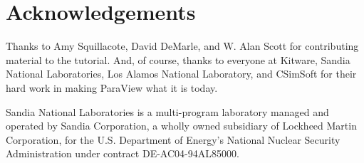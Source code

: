 \documentclass[@GLOBAL_OPTIONS@]{book}
\begin{document}
\tableofcontents

\listofexercise

\mainmatter











\backmatter

\chapter{Acknowledgements}

Thanks to Amy Squillacote, David DeMarle, and W. Alan Scott for
contributing material to the tutorial.  And, of course, thanks to everyone
at Kitware, Sandia National Laboratories, Los Alamos National Laboratory,
and CSimSoft for their hard work in making ParaView what it is today.

Sandia National Laboratories is a multi-program laboratory managed and
operated by Sandia Corporation, a wholly owned subsidiary of Lockheed
Martin Corporation, for the U.S. Department of Energy's National Nuclear
Security Administration under contract DE-AC04-94AL85000.

\clearpage
{}
{}
\printindex
\end{document}

